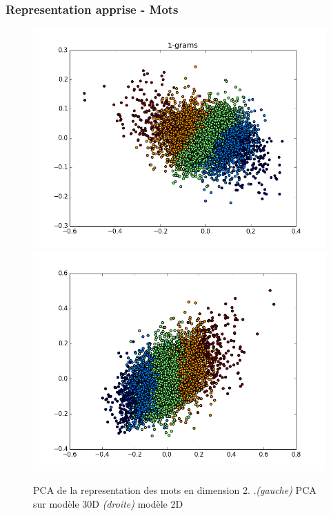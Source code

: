 \documentclass{beamer}
\begin{document}
\begin{frame}
\frametitle{Representation apprise - Mots}
\begin{figure}[htp]
\centering
\includegraphics[scale=0.25]{fig/WordPlot1.png}
\includegraphics[scale=0.25]{fig/model2d.png}

\caption[caption]{PCA de la representation des mots en dimension 2. \hspace{\textwidth}.\hspace{0.1\textwidth}\emph{(gauche)} PCA sur modèle 30D \emph{(droite)} modèle 2D}
\end{figure}

\end{frame}
\end{document}
